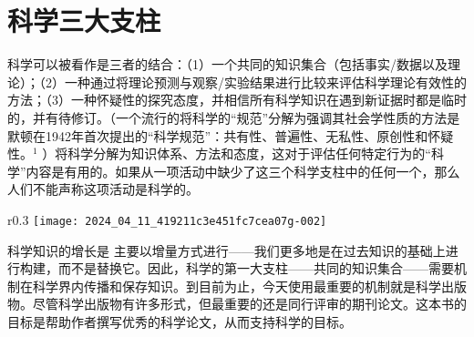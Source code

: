\section*{科学三大支柱}
科学可以被看作是三者的结合：（1）一个共同的知识集合（包括事实/数据以及理论）；（2）一种通过将理论预测与观察/实验结果进行比较来评估科学理论有效性的方法；（3）一种怀疑性的探究态度，并相信所有科学知识在遇到新证据时都是临时的，并有待修订。（一个流行的将科学的“规范”分解为强调其社会学性质的方法是默顿在1942年首次提出的“科学规范”：共有性、普遍性、无私性、原创性和怀疑性。${ }^{1}$ ）将科学分解为知识体系、方法和态度，这对于评估任何特定行为的“科学”内容是有用的。如果从一项活动中缺少了这三个科学支柱中的任何一个，那么人们不能声称这项活动是科学的。

\begin{wrapfigure}{r}{0.3\textwidth}
    \texttt{[image: 2024\_04\_11\_419211c3e451fc7cea07g-002]}
    \end{wrapfigure}

科学知识的增长是
主要以增量方式进行——我们更多地是在过去知识的基础上进行构建，而不是替换它。因此，科学的第一大支柱——共同的知识集合——需要机制在科学界内传播和保存知识。到目前为止，今天使用最重要的机制就是科学出版物。尽管科学出版物有许多形式，但最重要的还是同行评审的期刊论文。这本书的目标是帮助作者撰写优秀的科学论文，从而支持科学的目标。

